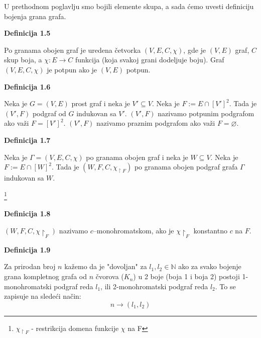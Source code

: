 \documentclass[12pt,a4paper]{article}
\newcommand\blfootnote[1]{%
  \begingroup
  \renewcommand\thefootnote{}\footnote{#1}%
  \addtocounter{footnote}{-1}%
  \endgroup
}
\begin{document}
	\noindent U prethodnom poglavlju smo bojili elemente skupa, a sada ćemo uvesti definiciju bojenja grana grafa.
	\begin{mdframed}
	{\noindent\fontsize{12pt}{12pt}\textbf{Definicija 1.5}}
	\vspace{0.5em}

	\noindent Po granama obojen graf je uredena četvorka $(V, E, C, \chi)$, gde je $(V, E)$ graf, $C$ skup boja,
	a $\chi : E \rightarrow C$ funkcija (koja svakoj grani dodeljuje boju). Graf
	$(V, E, C, \chi)$ je potpun ako je $(V, E)$ potpun.
	\end{mdframed}
	\vspace{0.5em}
	\begin{mdframed}
	{\noindent\fontsize{12pt}{12pt}\textbf{Definicija 1.6}}
	\vspace{0.5em}

	\noindent Neka je $G = (V, E)$ prost graf i neka je $V' \subseteq V$. Neka je $F := E \cap [V']^{2}$. 
	Tada je $(V' , F)$	podgraf od $G$ indukovan sa $V'$.
	$(V', F)$ nazivamo potpunim podgrafom ako važi $F = [V']^{2}$.
	$(V', F)$ nazivamo praznim podgrafom ako važi $F = \varnothing$.
	\end{mdframed}
	\vspace{0.5em}

	\begin{mdframed}

	{\noindent\fontsize{12pt}{12pt}\textbf{Definicija 1.7}}
	\vspace{0.5em}

	\noindent Neka je $\Gamma = (V, E, C, \chi)$ po granama obojen graf i neka je $W \subseteq V$. 
	Neka je $F := E \cap [W]^{2}$.
	Tada je $(W , F, C, \chi_{\upharpoonright F})$  po granama obojen podgraf grafa $\Gamma$ indukovan sa $W$.
	\end{mdframed}
	\vspace{0.5em}

\blfootnote{$ \chi_{\upharpoonright F}$ - restrikcija domena funkcije $\chi$ na F}

	\begin{mdframed}
	{\noindent\fontsize{12pt}{12pt}\textbf{Definicija 1.8}}
	\vspace{0.5em}

	\noindent 	$(W , F, C, \chi\upharpoonright_{F})$ nazivamo $c$–monohromatskom, ako je $\chi\upharpoonright_{F}$ konstantno $c$ na $F$.
	\end{mdframed}
	\vspace{0.5em}

	\begin{mdframed}
	{\noindent\fontsize{12pt}{12pt}\textbf{Definicija 1.9}}
	\vspace{0.5em}

	\noindent Za prirodan broj $n$ kažemo da je "dovoljan" za $l_1, l_2 \in \mathbb{N}$ ako za svako bojenje grana kompletnog grafa od $n$ čvorova ($K_n$) u 2 boje (boja 1 i boja 2) postoji 1-monohromatski podgraf reda $l_1$, ili 2-monohromatski podgraf reda $l_2$. To se zapisuje na sledeći način: \[n \rightarrow (l_{1}, l_{2})\] 
	\end{mdframed}
	
\end{document}
